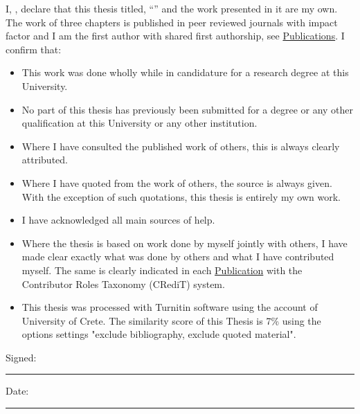 \documentclass[
11pt, %
english, %
singlespacing, %
liststotoc, %
toctotoc, %
headsepline, %
]{MastersDoctoralThesis} %
\begin{document}

\begin{declaration}
\addchaptertocentry{\authorshipname} %
\noindent I, \authorname, declare that this thesis titled, \enquote{\ttitle} and the work presented in it are my own. The work of three chapters is 
published in peer reviewed journals with impact factor and I am the first author with shared first authorship, see \hyperref[app:publications]{Publications}. I confirm that:

\begin{itemize} 
    \item This work was done wholly while in candidature for a research degree at this University.
    \item No part of this thesis has previously been submitted for a degree or any other qualification at this University or any other institution.
    \item Where I have consulted the published work of others, this is always clearly attributed.
    \item Where I have quoted from the work of others, the source is always given. With the exception of such quotations, this thesis is entirely my own work.
    \item I have acknowledged all main sources of help.
    \item Where the thesis is based on work done by myself jointly with others, I have made clear exactly what was done by others and what I have contributed myself. The same is clearly indicated in each \hyperref[app:publications]{Publication} with the Contributor Roles Taxonomy (CRediT) system.
    \item This thesis was processed with Turnitin software using the account of University of Crete. The similarity score of this Thesis is 7\% using the options settings "exclude bibliography, exclude quoted material".
\end{itemize}
% 
\noindent Signed:\\
\rule[0.5em]{25em}{0.5pt} %
 
\noindent Date:\\
\rule[0.5em]{25em}{0.5pt} %
\end{declaration}
%
\end{document}
